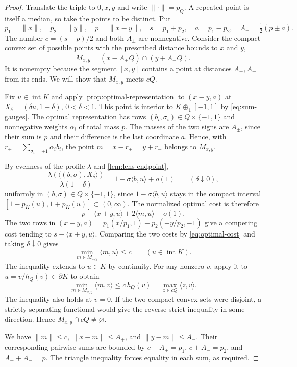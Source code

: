 \begin{proof}
Translate the triple to $0,x,y$ and write $\|\cdot\|=p_Q$. A repeated point is itself a median, so take the points to be distinct. Put
\[
 p_1=\|x\|,\quad p_2=\|y\|,\quad p=\|x-y\|,\quad
 s=p_1+p_2,\quad a=p_1-p_2,\quad A_\pm=\tfrac12(p\pm a).
\]
The number $c=(s-p)/2$ and both $A_\pm$ are nonnegative. Consider the compact convex set of possible points with the prescribed distance bounds to $x$ and $y$,
\[
 M_{x,y}=(x-A_+Q)\cap(y+A_-Q).
\]
It is nonempty because the segment $[x,y]$ contains a point at distances $A_+,A_-$ from its ends. We will show that $M_{x,y}$ meets $cQ$.

Fix $u\in\operatorname{int}K$ and apply \cref{prop:optimal-representation} to $(x-y,a)$ at $X_\delta=(\delta u,1-\delta)$, $0<\delta<1$. This point is interior to $K\oplus_1[-1,1]$ by \eqref{eq:sum-gauges}. The optimal representation has rows $(b_i,\sigma_i)\in Q\times\{-1,1\}$ and nonnegative weights $\alpha_i$ of total mass $p$. The masses of the two signs are $A_\pm$, since their sum is $p$ and their difference is the last coordinate $a$. Hence, with $r_\pm=\sum_{\sigma_i=\pm1}\alpha_i b_i$, the point $m=x-r_+=y+r_-$ belongs to $M_{x,y}$.

By evenness of the profile $\lambda$ and \cref{lem:lens-endpoint},
\[
 \frac{\lambda(\langle(b,\sigma),X_\delta\rangle)}
      {\lambda(1-\delta)}
   =1-\sigma\langle b,u\rangle+o(1)
 \qquad(\delta\downarrow0),
\]
uniformly in $(b,\sigma)\in Q\times\{-1,1\}$, since $1-\sigma\langle b,u\rangle$ stays in the compact interval $[1-p_K(u),1+p_K(u)]\subset(0,\infty)$. The normalized optimal cost is therefore
\[
 p-\langle x+y,u\rangle+2\langle m,u\rangle+o(1).
\]
The two rows in $(x-y,a)=p_1(x/p_1,1)+p_2(-y/p_2,-1)$ give a competing cost tending to $s-\langle x+y,u\rangle$. Comparing the two costs by \eqref{eq:optimal-cost} and taking $\delta\downarrow0$ gives
\[
 \min_{m\in M_{x,y}}\langle m,u\rangle\le c
 \qquad(u\in\operatorname{int}K).
\]
The inequality extends to $u\in K$ by continuity. For any nonzero $v$, apply it to $u=v/h_Q(v)\in\partial K$ to obtain
\[
 \min_{m\in M_{x,y}}\langle m,v\rangle
    \le c\,h_Q(v)=\max_{z\in cQ}\langle z,v\rangle .
\]
The inequality also holds at $v=0$. If the two compact convex sets were disjoint, a strictly separating functional would give the reverse strict inequality in some direction. Hence $M_{x,y}\cap cQ\ne\varnothing$.

We have $\|m\|\le c$, $\|x-m\|\le A_+$, and $\|y-m\|\le A_-$. Their corresponding pairwise sums are bounded by $c+A_+=p_1$, $c+A_-=p_2$, and $A_++A_-=p$. The triangle inequality forces equality in each sum, as required.
\end{proof}

